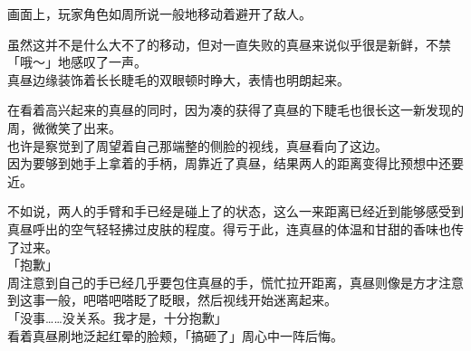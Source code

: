 画面上，玩家角色如周所说一般地移动着避开了敌人。

虽然这并不是什么大不了的移动，但对一直失败的真昼来说似乎很是新鲜，不禁「哦～」地感叹了一声。\\

真昼边缘装饰着长长睫毛的双眼顿时睁大，表情也明朗起来。

在看着高兴起来的真昼的同时，因为凑的获得了真昼的下睫毛也很长这一新发现的周，微微笑了出来。\\

也许是察觉到了周望着自己那端整的侧脸的视线，真昼看向了这边。\\

因为要够到她手上拿着的手柄，周靠近了真昼，结果两人的距离变得比预想中还要近。

不如说，两人的手臂和手已经是碰上了的状态，这么一来距离已经近到能够感受到真昼呼出的空气轻轻拂过皮肤的程度。得亏于此，连真昼的体温和甘甜的香味也传了过来。\\

「抱歉」\\

周注意到自己的手已经几乎要包住真昼的手，慌忙拉开距离，真昼则像是方才注意到这事一般，吧嗒吧嗒眨了眨眼，然后视线开始迷离起来。\\

「没事……没关系。我才是，十分抱歉」\\

看着真昼刷地泛起红晕的脸颊，「搞砸了」周心中一阵后悔。

